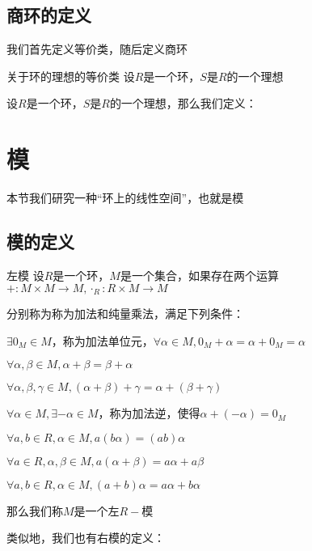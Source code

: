 \documentclass[12pt, a4paper, oneside, UTF8]{ctexbook}
\begin{document}
		\subsection{商环的定义}
			我们首先定义等价类，随后定义商环
			\begin{defn}{关于环的理想的等价类}{}
				设$R$是一个环，$S$是$R$的一个理想

			\end{defn}
			\begin{defn}
				设$R$是一个环，$S$是$R$的一个理想，那么我们定义：

				
			\end{defn}
	\section{模}
		本节我们研究一种“环上的线性空间”，也就是模
		\subsection{模的定义}
			\begin{defn}{左模}{}
				设$R$是一个环，$M$是一个集合，如果存在两个运算$+ : M \times M \rightarrow M,\cdot_R : R \times M \rightarrow M$
				
				分别称为称为加法和纯量乘法，满足下列条件：

				 $\exists 0_M \in M$，称为加法单位元，$\forall \alpha \in M,0_M + \alpha =\alpha +0_M=\alpha $

				 $\forall \alpha,\beta  \in M,\alpha +\beta =\beta +\alpha $

				 $\forall \alpha,\beta,\gamma  \in M,(\alpha +\beta )+\gamma =\alpha +(\beta +\gamma )$

				 $\forall \alpha \in M,\exists -\alpha \in M$，称为加法逆，使得$\alpha +(-\alpha )=0_M$

				 $\forall a,b \in R,\alpha \in M,a(b\alpha )=(ab)\alpha$

				 $\forall a \in R,\alpha ,\beta \in M,a(\alpha +\beta )=a\alpha +a\beta $

				 $\forall a,b \in R,\alpha \in M,(a+b)\alpha =a\alpha +b\alpha $

				那么我们称$M$是一个左$R-$模
			\end{defn}
			类似地，我们也有右模的定义：
\end{document}
